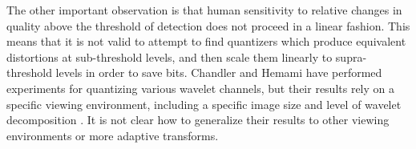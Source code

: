 \documentclass[11pt,letterpaper]{article}
\begin{document}
The other important observation is that human sensitivity to relative changes
 in quality above the threshold of detection does not proceed in a linear
 fashion.
This means that it is not valid to attempt to find quantizers which produce
 equivalent distortions at sub-threshold levels, and then scale them linearly
 to supra-threshold levels in order to save bits.
Chandler and Hemami have performed experiments for quantizing various wavelet
 channels, but their results rely on a specific viewing environment, including
 a specific image size and level of wavelet decomposition \cite{CH02b}.
It is not clear how to generalize their results to other viewing environments or
 more adaptive transforms.



\end{document}
